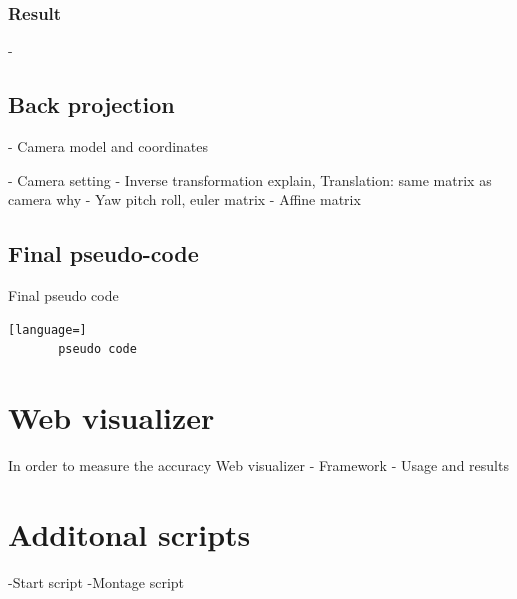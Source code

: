 \subsubsection{Result}
- 
\subsection{Back projection}
- Camera model and coordinates

- Camera setting
- Inverse transformation explain, Translation: same matrix as camera why
- Yaw pitch roll, euler matrix
- Affine matrix

\subsection{Final pseudo-code}
Final pseudo code
\begin{lstlisting}[language=]
       pseudo code
    \end{lstlisting}

\section{Web visualizer}
In order to measure the accuracy
Web visualizer
-  Framework
-  Usage and results

\section{Additonal scripts}
-Start script
-Montage script

